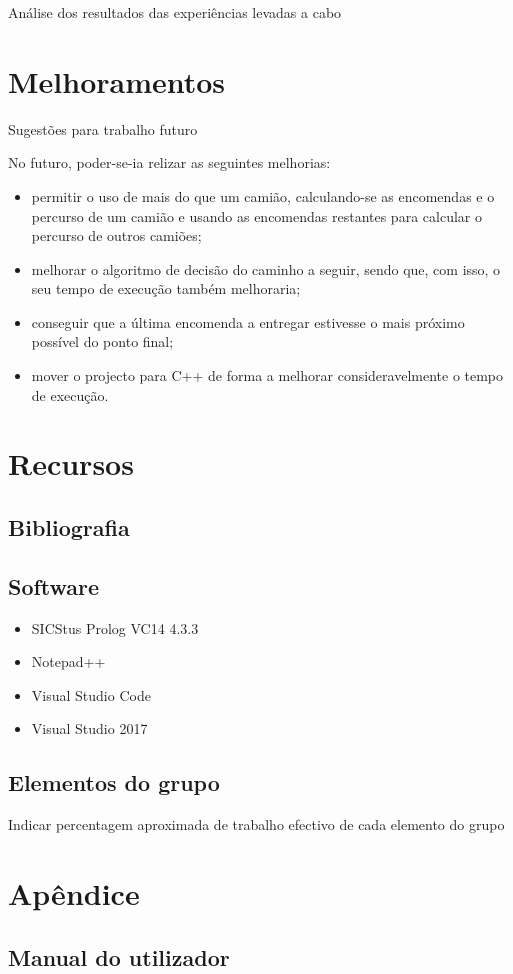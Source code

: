\documentclass[a4paper]{article}
\begin{document}
Análise dos resultados das experiências levadas a cabo

\newpage

\section{Melhoramentos}

Sugestões para trabalho futuro

No futuro, poder-se-ia relizar as seguintes melhorias:
\begin{itemize}
	\item permitir o uso de mais do que um camião, calculando-se as encomendas e o percurso de um camião e usando as encomendas restantes para calcular o percurso de outros camiões;
	\item melhorar o algoritmo de decisão do caminho a seguir, sendo que, com isso, o seu tempo de execução também melhoraria;
	\item conseguir que a última encomenda a entregar estivesse o mais próximo possível do ponto final;
	\item mover o projecto para C++ de forma a melhorar consideravelmente o tempo de execução.
\end{itemize}

\newpage

\section{Recursos}

\subsection{Bibliografia}

\subsection{Software}
\begin{itemize}
	\item SICStus Prolog VC14 4.3.3
	\item Notepad++
	\item Visual Studio Code
	\item Visual Studio 2017
\end{itemize}

\subsection{Elementos do grupo}
Indicar percentagem aproximada de trabalho efectivo de cada elemento do grupo


\clearpage
{}
\renewcommand\refname{Bibliografia}



\newpage
\appendix
\section{Apêndice}
\subsection{Manual do utilizador}
\end{document}
